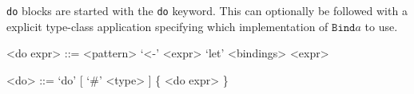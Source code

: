\texttt{do} blocks are started with the \texttt{do} keyword. This can optionally be followed with a explicit type-class application specifying which implementation of $\mathtt{Bind} a$ to use.

\begin{grammar}
<do expr> ::= <pattern> `<-' <expr>
           \alt `let' <bindings>
           \alt <expr>

<do>      ::= `do' [ `#' <type> ] \{ <do expr> \}
\end{grammar}


